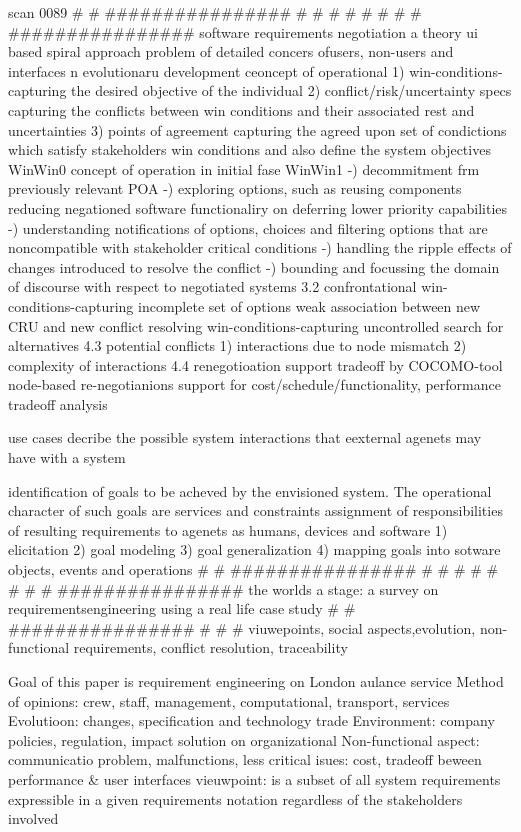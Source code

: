 scan 0089
# # ################
# # #
# # #
# # ################
software requirements negotiation a theory ui based spiral approach
problem of detailed concers ofusers, non-users and interfaces n evolutionaru development
ceoncept of operational
1) win-conditions-capturing the desired objective of the individual
2) conflict/risk/uncertainty specs capturing the conflicts between win conditions and their associated rest and uncertainties
3) points of agreement capturing the agreed upon set of condictions which satisfy stakeholders  win conditions and also define the system objectives
WinWin0 concept of operation in initial fase
WinWin1
-) decommitment frm previously relevant POA
-) exploring options, such as reusing components reducing negationed software functionaliry on deferring lower priority capabilities
-) understanding notifications of options, choices and filtering options that are noncompatible with stakeholder critical conditions
-) handling the ripple effects of changes introduced to resolve the conflict
-) bounding and focussing the domain of discourse with respect to negotiated systems
3.2
confrontational win-conditions-capturing
incomplete set of options
weak association between new CRU and new conflict resolving win-conditions-capturing
uncontrolled search for alternatives
4.3 potential conflicts
1) interactions due to node mismatch
2) complexity of interactions
4.4 renegotioation support
tradeoff by COCOMO-tool
node-based re-negotianions support for cost/schedule/functionality, performance tradeoff analysis

use cases decribe the possible system interactions that eexternal agenets may have with a system


identification of goals to be acheved by the envisioned system. The operational character of such goals are services and constraints assignment of responsibilities of resulting requirements to agenets as humans, devices and software
1) elicitation
2) goal modeling
3) goal generalization
4) mapping goals into sotware objects, events and operations
# # ################
# # #
# # #
# # ################
the worlds a stage: a survey on requirementsengineering using a real life case study
# # ################
# # #
viuwepoints, social aspects,evolution, non-functional requirements, conflict resolution, traceability

Goal of this paper is requirement  engineering on London aulance service
Method of opinions: crew, staff, management, computational, transport, services
Evolutioon: changes, specification and technology trade
Environment: company policies, regulation, impact solution on organizational
Non-functional aspect: communicatio problem, malfunctions, less critical isues: cost, tradeoff beween performance & user interfaces
vieuwpoint: is a subset of all system requirements expressible in a given requirements notation regardless of the stakeholders involved


